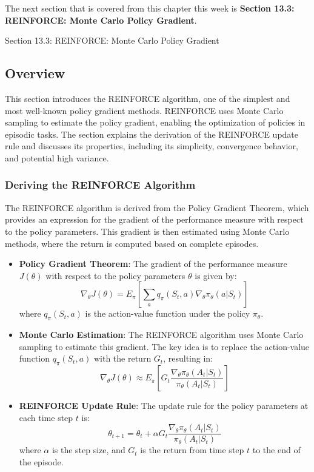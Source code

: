 The next section that is covered from this chapter this week is \textbf{Section 13.3: REINFORCE: Monte Carlo Policy Gradient}.

\begin{notes}{Section 13.3: REINFORCE: Monte Carlo Policy Gradient}
    \subsection*{Overview}

    This section introduces the REINFORCE algorithm, one of the simplest and most well-known policy gradient methods. REINFORCE uses Monte Carlo sampling to estimate the policy gradient, enabling the 
    optimization of policies in episodic tasks. The section explains the derivation of the REINFORCE update rule and discusses its properties, including its simplicity, convergence behavior, and potential 
    high variance.
    
    \subsubsection*{Deriving the REINFORCE Algorithm}
    
    The REINFORCE algorithm is derived from the Policy Gradient Theorem, which provides an expression for the gradient of the performance measure with respect to the policy parameters. This gradient is 
    then estimated using Monte Carlo methods, where the return is computed based on complete episodes.
    
    \begin{highlight}
    
        \begin{itemize}
            \item \textbf{Policy Gradient Theorem}: The gradient of the performance measure $J(\theta)$ with respect to the policy parameters $\theta$ is given by:
            \[
            \nabla_\theta J(\theta) = E_\pi \left[ \sum_a q_\pi(S_t, a) \nabla_\theta \pi_\theta(a|S_t) \right]
            \]
            where $q_\pi(S_t, a)$ is the action-value function under the policy $\pi_\theta$.
            \item \textbf{Monte Carlo Estimation}: The REINFORCE algorithm uses Monte Carlo sampling to estimate this gradient. The key idea is to replace the action-value function $q_\pi(S_t, a)$ with 
            the return $G_t$, resulting in:
            \[
            \nabla_\theta J(\theta) \approx E_\pi \left[ G_t \frac{\nabla_\theta \pi_\theta(A_t|S_t)}{\pi_\theta(A_t|S_t)} \right]
            \]
            \item \textbf{REINFORCE Update Rule}: The update rule for the policy parameters at each time step $t$ is:
            \[
            \theta_{t+1} = \theta_t + \alpha G_t \frac{\nabla_\theta \pi_\theta(A_t|S_t)}{\pi_\theta(A_t|S_t)}
            \]
            where $\alpha$ is the step size, and $G_t$ is the return from time step $t$ to the end of the episode.
        \end{itemize}
    

\end{highlight}
\end{notes}
